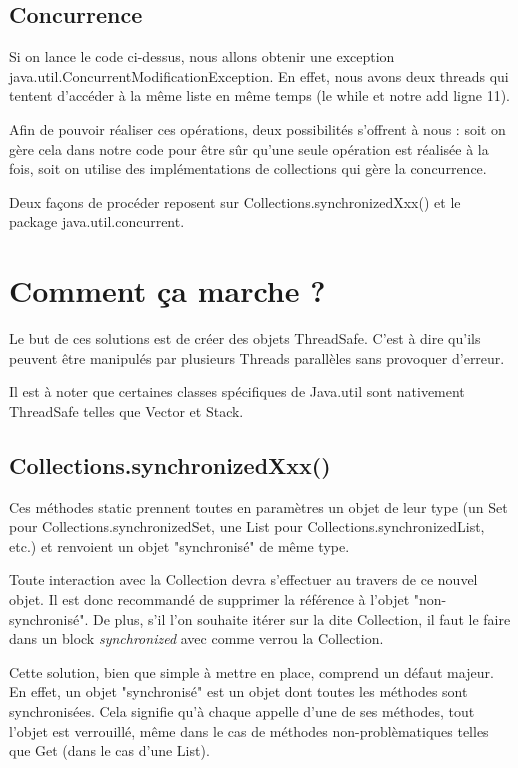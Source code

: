 \documentclass{report}
\begin{document}
		\section{Concurrence}
			
			
			Si on lance le code ci-dessus, nous allons obtenir une exception java.util.ConcurrentModificationException.
			En effet, nous avons deux threads qui tentent d'accéder à la même liste en même temps (le while et notre add ligne 11).
			
			Afin de pouvoir réaliser ces opérations, deux possibilités s'offrent à nous : soit on gère cela dans notre code pour être sûr qu'une seule opération est réalisée à la fois, soit on utilise des implémentations de collections qui gère la concurrence.
			
			Deux façons de procéder reposent sur Collections.synchronizedXxx() et le package java.util.concurrent.
			
	\chapter{Comment ça marche ?}

		Le but de ces solutions est de créer des objets ThreadSafe. C'est à dire qu'ils peuvent être manipulés par plusieurs Threads parallèles sans provoquer d'erreur.

		Il est à noter que certaines classes spécifiques de Java.util sont nativement ThreadSafe telles que Vector et Stack.

		\section{Collections.synchronizedXxx()}

			Ces méthodes static prennent toutes en paramètres un objet de leur type (un Set pour Collections.synchronizedSet, une List pour Collections.synchronizedList, etc.) et renvoient un objet "synchronisé" de même type.

			Toute interaction avec la Collection devra s'effectuer au travers de ce nouvel objet.
			Il est donc recommandé de supprimer la référence à l'objet "non-synchronisé".
			De plus, s'il l'on souhaite itérer sur la dite Collection, il faut le faire dans un block \textit{synchronized} avec comme verrou la Collection.

			Cette solution, bien que simple à mettre en place, comprend un défaut majeur.
			En effet, un objet "synchronisé" est un objet dont toutes les méthodes sont synchronisées.
			Cela signifie qu'à chaque appelle d'une de ses méthodes, tout l'objet est verrouillé, même dans le cas de méthodes non-problèmatiques telles que Get (dans le cas d'une List).
\end{document}
